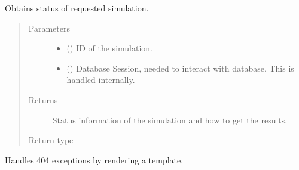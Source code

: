 \documentclass[a4paper,landscape,10pt,english]{sphinxmanual}
\begin{document}
\begin{fulllineitems}
\label{\detokenize{code_docs/simulation_api.controller:simulation_api.controller.main.api_simulate_status_sim_id}}
Obtains status of requested simulation.
\begin{quote}\begin{description}
\item[{Parameters}] \leavevmode\begin{itemize}
\item {} 
 () \textendash{} ID of the simulation.

\item {} 
 () \textendash{} Database Session, needed to interact with database. This is handled
internally.

\end{itemize}

\item[{Returns}] \leavevmode
Status information of the simulation and how to get the results.

\item[{Return type}] \leavevmode
{\hyperref[\detokenize{code_docs/simulation_api.controller:simulation_api.controller.schemas.SimStatus}]{}}

\end{description}\end{quote}

\end{fulllineitems}


\begin{fulllineitems}
\label{\detokenize{code_docs/simulation_api.controller:simulation_api.controller.main.custom_http_exception_handler}}
Handles 404 exceptions by rendering a template.

\end{fulllineitems}
\end{document}

